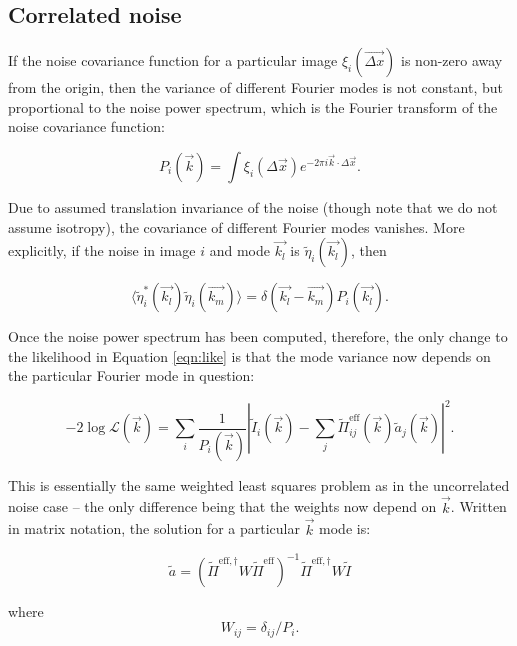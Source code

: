 \documentclass{article}
\begin{document}
\subsection{Correlated noise}

If the noise covariance function for a particular image $\xi_i(\vec{\Delta x})$ is non-zero away
from the origin, then the variance of different Fourier modes is not constant, but proportional to
the noise power spectrum, which is the Fourier transform of the noise covariance function:

\begin{equation}
  P_i(\vec{k}) = \int \xi_i(\Delta \vec{x}) e^{-2 \pi i \vec{k}\cdot\Delta\vec{x}}.
\end{equation}

Due to assumed translation invariance of the noise (though note that we do not assume isotropy), the
covariance of different Fourier modes vanishes.  More explicitly, if the noise in image $i$ and mode
$\vec{k_l}$ is $\tilde\eta_i(\vec{k_l})$, then

\begin{equation}
  \langle\tilde\eta_i^*(\vec{k_l})\tilde\eta_i(\vec{k_m})\rangle = \delta(\vec{k_l} - \vec{k_m})P_i(\vec{k_l}).
\end{equation}

Once the noise power spectrum has been computed, therefore, the only change to the likelihood in
Equation \ref{eqn:like} is that the mode variance now depends on the particular Fourier mode in
question:

\begin{equation}
    \label{eqn:likecorr}
    -2 \log \mathcal{L}(\vec{k}) = \sum_i\frac{1}{P_i(\vec{k})}\left|\tilde{I}_i(\vec{k}) - \sum_j \tilde{\Pi}^\mathrm{eff}_{ij}(\vec{k}) \tilde{a}_j(\vec{k})\right|^2.
\end{equation}

This is essentially the same weighted least squares problem as in the uncorrelated noise case -- the
only difference being that the weights now depend on $\vec{k}$.  Written in matrix notation, the
solution for a particular $\vec{k}$ mode is:

\begin{equation}
    \tilde{a} = \left(\tilde{\Pi}^{\mathrm{eff}, \dagger} W \tilde{\Pi}^\mathrm{eff} \right)^{-1} \tilde{\Pi}^{\mathrm{eff}, \dagger} W \tilde{I}
\end{equation}

where
\begin{equation}
    W_{ij} = \delta_{ij}/P_i.
\end{equation}
\end{document}
